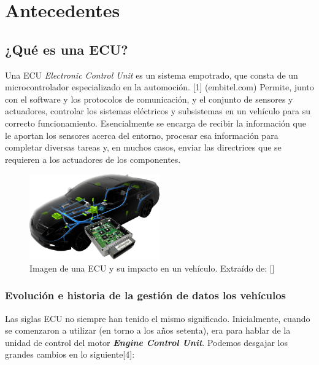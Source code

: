 \chapter{Antecedentes}


\section{¿Qué es una ECU?}


Una ECU \textit{Electronic Control Unit} es un sistema empotrado, que consta de un microcontrolador especializado en la automoción. [1] (embitel.com) Permite, junto con el software y los protocolos de comunicación, y el conjunto de sensores y actuadores, controlar los sistemas eléctricos y subsistemas en un vehículo para su correcto funcionamiento. 
Esencialmente se encarga de recibir la información que le aportan los sensores acerca del entorno, procesar esa información para completar diversas tareas y, en muchos casos, enviar las directrices que se requieren a los actuadores de los componentes.\newline


\begin{figure}[h]
    \centering
    \includegraphics[width=0.5\textwidth]{imagenes/ECU_autotechdrive.png}
    \caption{Imagen de una ECU y su impacto en un vehículo. Extraído de: []}
\end{figure}


\subsection{Evolución e historia de la gestión de datos los vehículos}

Las siglas ECU no siempre han tenido el mismo significado. Inicialmente, cuando se comenzaron a utilizar (en torno a los años setenta), era para hablar de la unidad de control del motor \textit{\textbf{Engine Control Unit}}. Podemos desgajar los grandes cambios en lo siguiente[4]:

